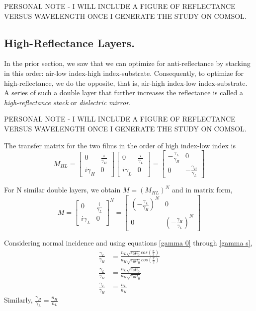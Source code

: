 PERSONAL NOTE - I WILL INCLUDE A FIGURE OF REFLECTANCE VERSUS WAVELENGTH ONCE I GENERATE THE STUDY ON COMSOL.

\subsection{High-Reflectance Layers.}
In the prior section, we saw that we can optimize for anti-reflectance by stacking in this order: air-low index-high index-substrate. Consequently, to optimize for high-reflectance, we do the opposite, that is, air-high index-low index-substrate. A series of such a double layer that further increases the reflectance is called a \emph{high-reflectance stack} or \emph{dielectric mirror}.

PERSONAL NOTE - I WILL INCLUDE A FIGURE OF REFLECTANCE VERSUS WAVELENGTH ONCE I GENERATE THE STUDY ON COMSOL.

The transfer matrix for the two films in the order of high index-low index is
\[
  M_{HL} = 
    \begin{bmatrix}
    0 & \frac{i}{\gamma_H} \\
    i\gamma_H & 0
    \end{bmatrix}
    \begin{bmatrix}
    0 & \frac{i}{\gamma_L} \\
    i\gamma_L & 0
    \end{bmatrix} =
        \begin{bmatrix}
            -\frac{\gamma_L}{\gamma_H} & 0  \\
            0 & -\frac{\gamma_H}{\gamma_L}
        \end{bmatrix}
\]

For N similar double layers, we obtain $M = (M_{HL})^N$ and in matrix form,
\[
  M = 
    \begin{bmatrix}
    0 & \frac{i}{\gamma_L} \\
    i\gamma_L & 0
    \end{bmatrix}^N =
        \begin{bmatrix}
            \left(-\frac{\gamma_L}{\gamma_H}\right)^N & 0  \\
            0 & \left(-\frac{\gamma_H}{\gamma_L}\right)^N
        \end{bmatrix}
\]

Considering normal incidence and using equations \ref{gamma 0} through \ref{gamma s},
\begin{align*}
    \frac{\gamma_L}{\gamma_H} &= \frac{n_L\sqrt{\varepsilon_0\mu_0}cos(\frac{\pi}{2})}{n_H\sqrt{\varepsilon_0\mu_0}cos(\frac{\pi}{2})}\\
    \frac{\gamma_L}{\gamma_H} &= \frac{n_L\sqrt{\varepsilon_0\mu_0}}{n_H\sqrt{\varepsilon_0\mu_0}}  \\
    \frac{\gamma_L}{\gamma_H} &= \frac{n_L}{n_H}
\end{align*}
Similarly, $\frac{\gamma_H}{\gamma_L} = \frac{n_H}{n_L}$

